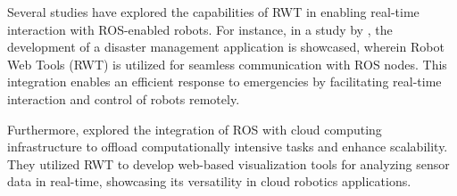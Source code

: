 Several studies have explored the capabilities of RWT in enabling real-time interaction with ROS-enabled robots. For instance, in a study by \citet{qureshi2016poster}, the development of a disaster management application is showcased, wherein Robot Web Tools (RWT) is utilized for seamless communication with ROS nodes. This integration enables an efficient response to emergencies by facilitating real-time interaction and control of robots remotely.

Furthermore, \citet{lim2019cloud} explored the integration of ROS with cloud computing infrastructure to offload computationally intensive tasks and enhance scalability. They utilized RWT to develop web-based visualization tools for analyzing sensor data in real-time, showcasing its versatility in cloud robotics applications.





